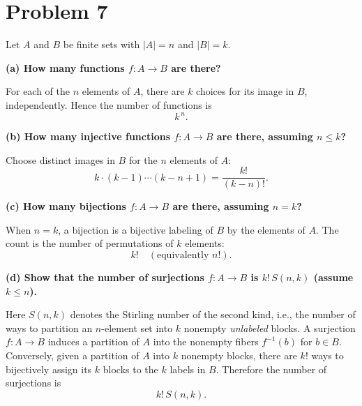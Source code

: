 \section*{Problem 7}
Let \(A\) and \(B\) be finite sets with \(|A|=n\) and \(|B|=k\).

\medskip
\textbf{(a) How many functions \(f:A\to B\) are there?}

For each of the \(n\) elements of \(A\), there are \(k\) choices for its image in \(B\), independently.
Hence the number of functions is
\[
k^{\,n}.
\]

\medskip
\textbf{(b) How many injective functions \(f:A\to B\) are there, assuming \(n\le k\)?}

Choose distinct images in \(B\) for the \(n\) elements of \(A\):
\[
k\cdot (k-1)\cdots (k-n+1)=\frac{k!}{(k-n)!}.
\]

\medskip
\textbf{(c) How many bijections \(f:A\to B\) are there, assuming \(n=k\)?}

When \(n=k\), a bijection is a bijective labeling of \(B\) by the elements of \(A\).
The count is the number of permutations of \(k\) elements:
\[
k! \quad (\text{equivalently } n!).
\]

\medskip
\textbf{(d) Show that the number of surjections \(f:A\to B\) is \(k!\,S(n,k)\) (assume \(k\le n\)).}

Here \(S(n,k)\) denotes the Stirling number of the second kind, i.e., the number of ways to partition
an \(n\)-element set into \(k\) nonempty \emph{unlabeled} blocks.
A surjection \(f:A\to B\) induces a partition of \(A\) into the nonempty fibers \(f^{-1}(b)\) for \(b\in B\).
Conversely, given a partition of \(A\) into \(k\) nonempty blocks, there are \(k!\) ways to bijectively assign
its \(k\) blocks to the \(k\) labels in \(B\).
Therefore the number of surjections is
\[
k!\,S(n,k).
\]
